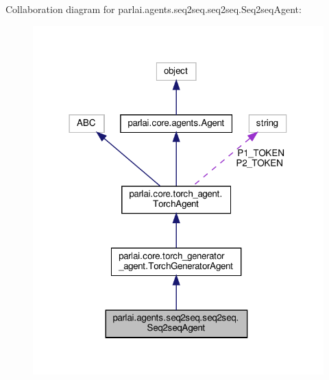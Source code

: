 Collaboration diagram for parlai.\+agents.\+seq2seq.\+seq2seq.\+Seq2seq\+Agent\+:
\nopagebreak
\begin{figure}[H]
\begin{center}
\leavevmode
\includegraphics[width=318pt]{d8/db0/classparlai_1_1agents_1_1seq2seq_1_1seq2seq_1_1Seq2seqAgent__coll__graph}
\end{center}
\end{figure}
